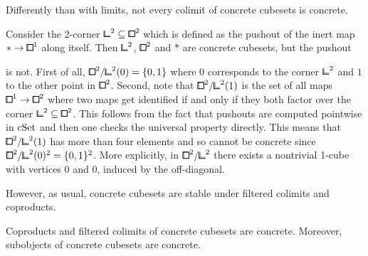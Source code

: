 Differently than with limits, not every colimit of concrete cubesets is concrete.

\begin{example}\label{ex:concrete-colimit-not}
Consider the 2-corner ${\bbcor}^2\sub{\bbox}^2$ which is defined as the pushout of the inert map $\ast\to{\bbox}^1$ along itself.
Then ${\bbcor}^2$, ${\bbox}^2$ and $\ast$ are concrete cubesets, but the pushout
\begin{center}
\end{center}
is not.
First of all, ${\bbox}^2/{\bbcor}^2(0) = \{0,1\}$ where $0$ corresponds to the corner ${\bbcor}^2$ and $1$ to the other point in ${\bbox}^2$.
Second, note that ${\bbox}^2/{\bbcor}^2(1)$ is the set of all maps ${\bbox}^1\to{\bbox}^2$ where two maps get identified if and only if they both factor over the corner ${\bbcor}^2\sub{\bbox}^2$.
This follows from the fact that pushouts are computed pointwise in $\mathrm{cSet}$ and then one checks the universal property directly.
This means that ${\bbox}^2/{\bbcor}^2(1)$ has more than four elements and so cannot be concrete since ${\bbox}^2/{\bbcor}^2(0)^2 = \{0,1\}^2$.
More explicitly, in ${\bbox}^2/{\bbcor}^2$ there exists a nontrivial 1-cube with vertices $0$ and $0$, induced by the off-diagonal.
\end{example}

However, as usual, concrete cubesets are stable under filtered colimits and coproducts.

\begin{proposition}\label{prop:concrete-stability}
Coproducts and filtered colimits of concrete cubesets are concrete.
Moreover, subobjects of concrete cubesets are concrete.
\end{proposition}

